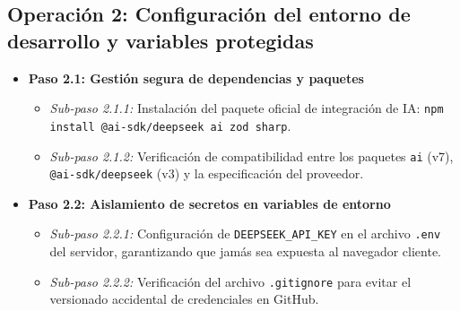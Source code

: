 \documentclass[11pt,a4paper]{article}
\begin{document}
\subsection{Operación 2: Configuración del entorno de desarrollo y variables protegidas}
\begin{itemize}
    \item \textbf{Paso 2.1: Gestión segura de dependencias y paquetes}
    \begin{itemize}
        \item \textit{Sub-paso 2.1.1:} Instalación del paquete oficial de integración de IA: \texttt{npm install @ai-sdk/deepseek ai zod sharp}.
        \item \textit{Sub-paso 2.1.2:} Verificación de compatibilidad entre los paquetes \texttt{ai} (v7), \texttt{@ai-sdk/deepseek} (v3) y la especificación del proveedor.
    \end{itemize}
    \item \textbf{Paso 2.2: Aislamiento de secretos en variables de entorno}
    \begin{itemize}
        \item \textit{Sub-paso 2.2.1:} Configuración de \texttt{DEEPSEEK\_API\_KEY} en el archivo \texttt{.env} del servidor, garantizando que jamás sea expuesta al navegador cliente.
        \item \textit{Sub-paso 2.2.2:} Verificación del archivo \texttt{.gitignore} para evitar el versionado accidental de credenciales en GitHub.
    \end{itemize}
\end{itemize}
\end{document}
